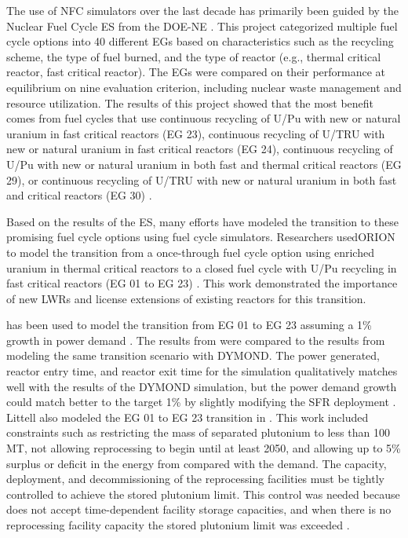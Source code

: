 The use of \gls{NFC} simulators over the 
last decade has primarily been guided by the Nuclear Fuel Cycle \gls{ES} 
from the \gls{DOE-NE} \cite{wigeland_nuclear_2014}. This project
categorized multiple fuel cycle options into 40 different \glspl{EG} 
based on characteristics such as the recycling scheme, the type of fuel 
burned, 
and the type of reactor (e.g., thermal critical reactor, fast critical reactor). 
The \glspl{EG} were compared on their performance at equilibrium on nine evaluation 
criterion, including nuclear waste management and resource utilization. The 
results of this project showed that the most benefit comes from fuel cycles 
that use continuous recycling of U/Pu with new or natural uranium in fast critical 
reactors (\gls{EG} 23), continuous recycling of U/\gls{TRU} with new or natural 
uranium in fast critical reactors (\gls{EG} 24), continuous recycling of U/Pu 
with new or natural uranium in both fast and thermal critical reactors 
(\gls{EG} 29), or continuous recycling of U/\gls{TRU} with new or natural uranium in 
both fast and critical reactors (\gls{EG} 30) \cite{wigeland_nuclear_2014}. 

Based on the results of the \gls{ES}, many efforts have modeled 
the transition to these promising fuel cycle options using fuel cycle 
simulators. Researchers used\gls{ORION} to model the transition from a 
once-through fuel cycle option using enriched uranium in thermal critical 
reactors to a closed fuel cycle with U/Pu recycling in fast 
critical reactors (\gls{EG} 01 to \gls{EG} 23) \cite{sunny_transition_2015}.
This work 
demonstrated the importance of new \glspl{LWR} and license 
extensions of existing reactors for this transition. 

\Cyclus has been used to model the transition from \gls{EG} 01 to \gls{EG} 
23 assuming a 1\% growth in power demand 
\cite{djokic_application_2015}. The results from \Cyclus were compared 
to the results from modeling the same transition scenario with \gls{DYMOND}. 
The power generated, reactor entry 
time, and reactor exit time for the \Cyclus simulation qualitatively 
matches well with the results of the \gls{DYMOND} simulation, but the power 
demand growth could match better to the target 1\% by slightly modifying 
the \gls{SFR} deployment \cite{djokic_application_2015}. Littell 
\cite{littell_development_2016}
also modeled the \gls{EG} 01 to \gls{EG} 23 transition in \Cyclus. 
This work included constraints such as restricting the mass of separated 
plutonium to less than 100 MT, not allowing reprocessing to begin until 
at least 2050, and allowing up to 5\% surplus or deficit in the energy 
from compared with the demand. The capacity, deployment, and 
decommissioning of the reprocessing facilities must be tightly controlled
to achieve the stored plutonium limit. This control was needed 
because \Cyclus does not accept time-dependent facility storage capacities, 
and when there is no reprocessing facility capacity the stored plutonium 
limit was exceeded \cite{littell_development_2016}. 

